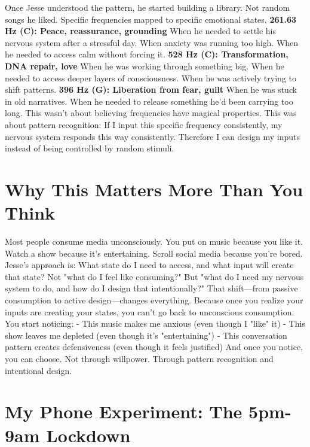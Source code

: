 Once Jesse understood the pattern, he started building a library.
Not random songs he liked. Specific frequencies mapped to specific emotional states.
\textbf{261.63 Hz (C): Peace, reassurance, grounding}
When he needed to settle his nervous system after a stressful day. When anxiety was running too high. When he needed to access calm without forcing it.
\textbf{528 Hz (C\sharp): Transformation, DNA repair, love}
When he was working through something big. When he needed to access deeper layers of consciousness. When he was actively trying to shift patterns.
\textbf{396 Hz (G): Liberation from fear, guilt}
When he was stuck in old narratives. When he needed to release something he'd been carrying too long.
This wasn't about believing frequencies have magical properties.
This was about pattern recognition: If I input this specific frequency consistently, my nervous system responds this way consistently. Therefore I can design my inputs instead of being controlled by random stimuli.

\section{Why This Matters More Than You Think}

Most people consume media unconsciously.
You put on music because you like it. Watch a show because it's entertaining. Scroll social media because you're bored.
Jesse's approach is: What state do I need to access, and what input will create that state?
Not "what do I feel like consuming?" But "what do I need my nervous system to do, and how do I design that intentionally?"
That shift—from passive consumption to active design—changes everything.
Because once you realize your inputs are creating your states, you can't go back to unconscious consumption. You start noticing:
- This music makes me anxious (even though I "like" it)
- This show leaves me depleted (even though it's "entertaining")
- This conversation pattern creates defensiveness (even though it feels justified)
And once you notice, you can choose.
Not through willpower. Through pattern recognition and intentional design.

\section{My Phone Experiment: The 5pm-9am Lockdown}

